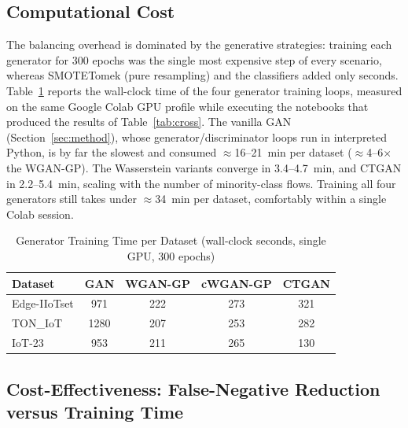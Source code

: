 ﻿\documentclass[journal]{IEEEtran}
\begin{document}
\subsection{Computational Cost}
The balancing overhead is dominated by the generative strategies: training each generator for 300 epochs was the single most expensive step of every scenario, whereas SMOTETomek (pure resampling) and the classifiers added only seconds. Table~\ref{tab:cost} reports the wall-clock time of the four generator training loops, measured on the same Google Colab GPU profile while executing the notebooks that produced the results of Table~\ref{tab:cross}. The vanilla GAN (Section~\ref{sec:method}), whose generator/discriminator loops run in interpreted Python, is by far the slowest and consumed $\approx$16--21~min per dataset ($\approx$4--6$\times$ the WGAN-GP). The Wasserstein variants converge in 3.4--4.7~min, and CTGAN in 2.2--5.4~min, scaling with the number of minority-class flows. Training all four generators still takes under $\approx$34~min per dataset, comfortably within a single Colab session.

\begin{table}[!t]
\caption{Generator Training Time per Dataset (wall-clock seconds, single GPU, 300 epochs)}
\label{tab:cost}
\begin{center}
\footnotesize
\setlength{\tabcolsep}{6pt}
\begin{tabular}{@{}lcccc@{}}
\toprule
\textbf{Dataset} & \textbf{GAN} & \textbf{WGAN-GP} & \textbf{cWGAN-GP} & \textbf{CTGAN} \\
\midrule
Edge-IIoTset & 971 & 222 & 273 & 321 \\
TON\_IoT & 1280 & 207 & 253 & 282 \\
IoT-23 & 953 & 211 & 265 & 130 \\
\bottomrule
\end{tabular}
\end{center}
\end{table}

\subsection{Cost-Effectiveness: False-Negative Reduction versus Training Time}
\label{sec:fntt}
\end{document}
